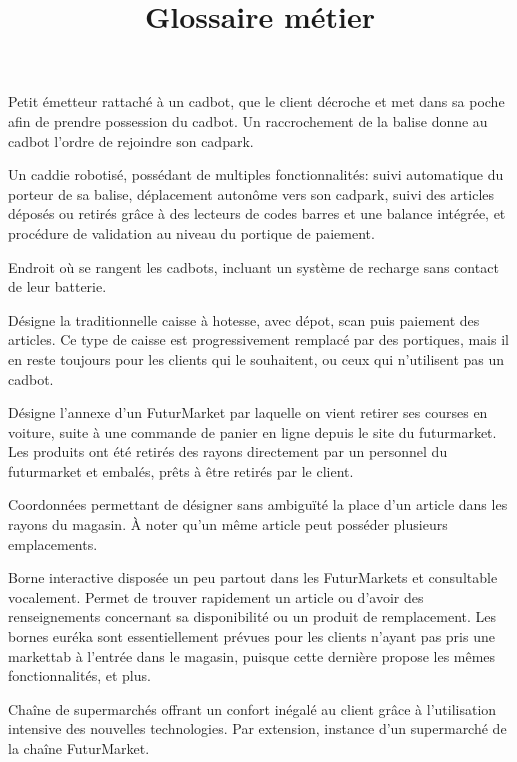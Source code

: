 \title{Glossaire métier}

Petit émetteur rattaché à un cadbot, que le client décroche et met dans sa poche afin de prendre possession du cadbot.
Un raccrochement de la balise donne au cadbot l'ordre de rejoindre son cadpark.
\par

Un caddie robotisé, possédant de multiples fonctionnalités: suivi automatique du porteur de sa balise, déplacement autonôme vers son cadpark, suivi des articles déposés ou retirés grâce à des lecteurs de codes barres et une balance intégrée, et procédure de validation au niveau du portique de paiement.
\par

Endroit où se rangent les cadbots, incluant un système de recharge sans contact de leur batterie.
\par

Désigne la traditionnelle caisse à hotesse, avec dépot, scan puis paiement des articles.
Ce type de caisse est progressivement remplacé par des portiques, mais il en reste toujours pour les clients qui le souhaitent, ou ceux qui n'utilisent pas un cadbot.
\par

Désigne l'annexe d'un FuturMarket par laquelle on vient retirer ses courses en voiture, suite à une commande de panier en ligne depuis le site du futurmarket.
Les produits ont été retirés des rayons directement par un personnel du futurmarket et embalés, prêts à être retirés par le client.
\par

Coordonnées permettant de désigner sans ambiguïté la place d'un article dans les rayons du magasin.
À noter qu'un même article peut posséder plusieurs emplacements.
\par

Borne interactive disposée un peu partout dans les FuturMarkets et consultable vocalement.
Permet de trouver rapidement un article ou d'avoir des renseignements concernant sa disponibilité ou un produit de remplacement.
Les bornes euréka sont essentiellement prévues pour les clients n'ayant pas pris une markettab à l'entrée dans le magasin, puisque cette dernière propose les mêmes fonctionnalités, et plus.
\par

Chaîne de supermarchés offrant un confort inégalé au client grâce à l'utilisation intensive des nouvelles technologies.
Par extension, instance d'un supermarché de la chaîne FuturMarket.
\par

